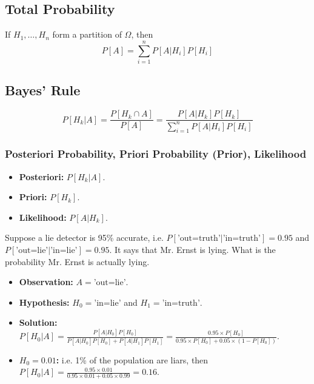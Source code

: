 \subsection{Total Probability}
\begin{definition}
    If $H_1,\ldots,H_n$ form a partition of $\Omega$, then
    \begin{equation}
        P[A] = \sum_{i=1}^{n} P[A|H_i]P[H_i]
    \end{equation}
\end{definition}

\subsection{Bayes' Rule}
\begin{definition}
    \begin{equation}
        P[H_k|A] = \frac{P[H_k \cap A]}{P[A]} = \frac{P[A|H_k]P[H_k]}{\sum_{i=1}^{n} P[A|H_i]P[H_i]}
    \end{equation}
\end{definition}

\subsubsection{Posteriori Probability, Priori Probability (Prior), Likelihood}
\begin{definition}
    \begin{itemize}
        \item \textbf{Posteriori:} $P[H_k|A]$.
        \item \textbf{Priori:} $P[H_k]$.
        \item \textbf{Likelihood:} $P[A|H_k]$.
    \end{itemize}
\end{definition}

\begin{example}
    Suppose a lie detector is 95\% accurate, i.e. $P[\text{'out=truth'}|\text{'in=truth'}] = 0.95$ and $P[\text{'out=lie'}|\text{'in=lie'}] = 0.95$. It says that Mr. Ernst is lying. What is the probability Mr. Ernst is actually lying.
    \begin{itemize}
        \item \textbf{Observation:} $A = \text{'out=lie'}$.
        \item \textbf{Hypothesis:} $H_0 = \text{'in=lie'}$ and $H_1 = \text{'in=truth'}$.
        \item \textbf{Solution:} $P[H_0|A] = \frac{P[A|H_0]P[H_0]}{P[A|H_0]P[H_0] + P[A|H_1]P[H_1]} = \frac{0.95 \times P[H_0]}{0.95 \times P[H_0] + 0.05 \times (1 - P[H_0])}$.
        \item \textbf{$H_0 = 0.01$:} i.e. 1\% of the population are liars, then $P[H_0|A] = \frac{0.95 \times 0.01}{0.95 \times 0.01 + 0.05 \times 0.99} = 0.16$.
    \end{itemize}
\end{example}

